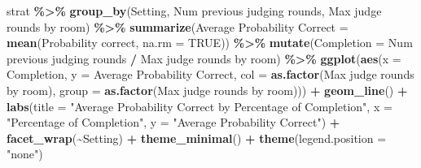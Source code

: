 \documentclass[
]{article}
\newenvironment{Shaded}{\begin{snugshade}}{\end{snugshade}}
\newcommand{\AttributeTok}[1]{\textcolor[rgb]{0.13,0.29,0.53}{#1}}
\newcommand{\ConstantTok}[1]{\textcolor[rgb]{0.56,0.35,0.01}{#1}}
\newcommand{\FunctionTok}[1]{\textcolor[rgb]{0.13,0.29,0.53}{\textbf{#1}}}
\newcommand{\NormalTok}[1]{#1}
\newcommand{\OtherTok}[1]{\textcolor[rgb]{0.56,0.35,0.01}{#1}}
\newcommand{\SpecialCharTok}[1]{\textcolor[rgb]{0.81,0.36,0.00}{\textbf{#1}}}
\newcommand{\StringTok}[1]{\textcolor[rgb]{0.31,0.60,0.02}{#1}}
\begin{document}
\begin{Shaded}
\begin{Highlighting}[]
\NormalTok{strat }\SpecialCharTok{\%\textgreater{}\%}
  \FunctionTok{group\_by}\NormalTok{(Setting, }\StringTok{\textasciigrave{}}\AttributeTok{Num previous judging rounds}\StringTok{\textasciigrave{}}\NormalTok{, }\StringTok{\textasciigrave{}}\AttributeTok{Max judge rounds by room}\StringTok{\textasciigrave{}}\NormalTok{) }\SpecialCharTok{\%\textgreater{}\%}
  \FunctionTok{summarize}\NormalTok{(}\StringTok{\textasciigrave{}}\AttributeTok{Average Probability Correct}\StringTok{\textasciigrave{}} \OtherTok{=} \FunctionTok{mean}\NormalTok{(}\StringTok{\textasciigrave{}}\AttributeTok{Probability correct}\StringTok{\textasciigrave{}}\NormalTok{, }\AttributeTok{na.rm =} \ConstantTok{TRUE}\NormalTok{)) }\SpecialCharTok{\%\textgreater{}\%}
  \FunctionTok{mutate}\NormalTok{(}\AttributeTok{Completion =} \StringTok{\textasciigrave{}}\AttributeTok{Num previous judging rounds}\StringTok{\textasciigrave{}} \SpecialCharTok{/} \StringTok{\textasciigrave{}}\AttributeTok{Max judge rounds by room}\StringTok{\textasciigrave{}}\NormalTok{) }\SpecialCharTok{\%\textgreater{}\%}
  \FunctionTok{ggplot}\NormalTok{(}\FunctionTok{aes}\NormalTok{(}\AttributeTok{x =}\NormalTok{ Completion, }\AttributeTok{y =} \StringTok{\textasciigrave{}}\AttributeTok{Average Probability Correct}\StringTok{\textasciigrave{}}\NormalTok{, }\AttributeTok{col =} \FunctionTok{as.factor}\NormalTok{(}\StringTok{\textasciigrave{}}\AttributeTok{Max judge rounds by room}\StringTok{\textasciigrave{}}\NormalTok{), }\AttributeTok{group =} \FunctionTok{as.factor}\NormalTok{(}\StringTok{\textasciigrave{}}\AttributeTok{Max judge rounds by room}\StringTok{\textasciigrave{}}\NormalTok{))) }\SpecialCharTok{+}
  \FunctionTok{geom\_line}\NormalTok{() }\SpecialCharTok{+}
  \FunctionTok{labs}\NormalTok{(}\AttributeTok{title =} \StringTok{"Average Probability Correct by Percentage of Completion"}\NormalTok{,}
       \AttributeTok{x =} \StringTok{"Percentage of Completion"}\NormalTok{, }
       \AttributeTok{y =} \StringTok{"Average Probability Correct"}\NormalTok{) }\SpecialCharTok{+}
  \FunctionTok{facet\_wrap}\NormalTok{(}\SpecialCharTok{\textasciitilde{}}\NormalTok{Setting) }\SpecialCharTok{+}
  \FunctionTok{theme\_minimal}\NormalTok{() }\SpecialCharTok{+}
  \FunctionTok{theme}\NormalTok{(}\AttributeTok{legend.position =} \StringTok{"none"}\NormalTok{)}
\end{Highlighting}
\end{Shaded}
\end{document}
